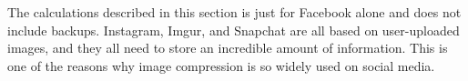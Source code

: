 The calculations described in this section is just for Facebook alone and does not include backups. Instagram, Imgur,
and Snapchat are all based on user-uploaded images, and they all need to store an incredible amount of information.
This is one of the reasons why image compression is so widely used on social media.
